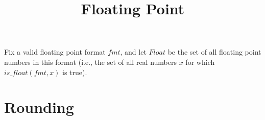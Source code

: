 \documentclass{article}
\title{Floating Point}
\date{}
\author{}
\begin{document}
\theoremstyle{definition}
\newtheorem{thm}{Theorem}[section]
\newtheorem{lem}[thm]{Lemma}
\newtheorem{defn}[thm]{Definition}

\maketitle

Fix a valid floating point format $fmt$, and let $Float$ be the set of all 
floating point numbers in this format (i.e., the set of all real numbers 
$x$ for which $is\_float(fmt,x)$ is true).

\section{Rounding}
\end{document}
